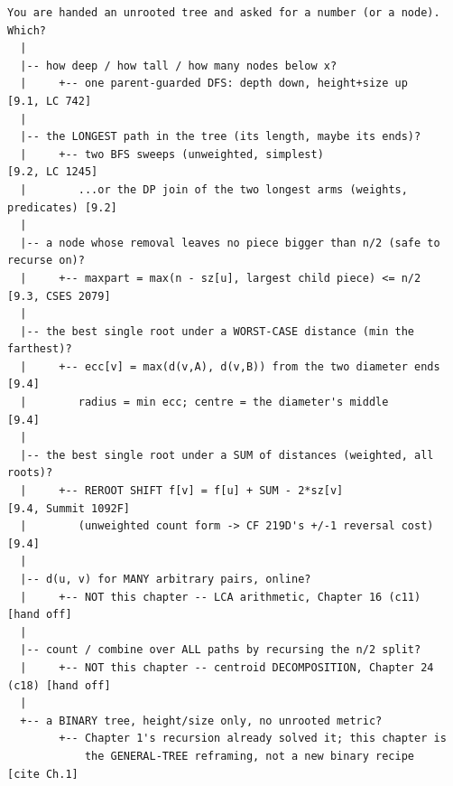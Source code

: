 \begin{lstlisting}[language={}, basicstyle=\ttfamily\small, numbers=none, frame=single]
  You are handed an unrooted tree and asked for a number (or a node). Which?
  |
  |-- how deep / how tall / how many nodes below x?
  |     +-- one parent-guarded DFS: depth down, height+size up       [9.1, LC 742]
  |
  |-- the LONGEST path in the tree (its length, maybe its ends)?
  |     +-- two BFS sweeps (unweighted, simplest)                   [9.2, LC 1245]
  |        ...or the DP join of the two longest arms (weights, predicates) [9.2]
  |
  |-- a node whose removal leaves no piece bigger than n/2 (safe to recurse on)?
  |     +-- maxpart = max(n - sz[u], largest child piece) <= n/2    [9.3, CSES 2079]
  |
  |-- the best single root under a WORST-CASE distance (min the farthest)?
  |     +-- ecc[v] = max(d(v,A), d(v,B)) from the two diameter ends  [9.4]
  |        radius = min ecc; centre = the diameter's middle          [9.4]
  |
  |-- the best single root under a SUM of distances (weighted, all roots)?
  |     +-- REROOT SHIFT f[v] = f[u] + SUM - 2*sz[v]                 [9.4, Summit 1092F]
  |        (unweighted count form -> CF 219D's +/-1 reversal cost)   [9.4]
  |
  |-- d(u, v) for MANY arbitrary pairs, online?
  |     +-- NOT this chapter -- LCA arithmetic, Chapter 16 (c11)     [hand off]
  |
  |-- count / combine over ALL paths by recursing the n/2 split?
  |     +-- NOT this chapter -- centroid DECOMPOSITION, Chapter 24 (c18) [hand off]
  |
  +-- a BINARY tree, height/size only, no unrooted metric?
        +-- Chapter 1's recursion already solved it; this chapter is
            the GENERAL-TREE reframing, not a new binary recipe       [cite Ch.1]
\end{lstlisting}


